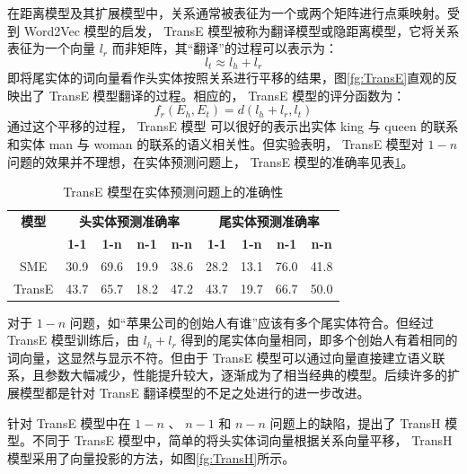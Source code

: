 \documentclass{llncs}
\begin{document}
在距离模型及其扩展模型中，关系通常被表征为一个或两个矩阵进行点乘映射。受到 Word2Vec 模型\cite{DBLP:conf/nips/MikolovSCCD13,DBLP:journals/corr/abs-1301-3781}的启发， TransE 模型\cite{DBLP:conf/nips/BordesUGWY13}被称为翻译模型或隐距离模型，它将关系表征为一个向量 $l_r$ 而非矩阵，其“翻译”的过程可以表示为：
\begin{displaymath}
l_t\approx l_h+l_r
\end{displaymath}
即将尾实体的词向量看作头实体按照关系进行平移的结果，图\ref{fg:TransE}直观的反映出了 TransE 模型翻译的过程。相应的， TransE 模型的评分函数为：
\begin{displaymath}
f_r(E_h,E_t)=d(l_h+l_r,l_t)
\end{displaymath}
通过这个平移的过程， TransE 模型 可以很好的表示出实体 king 与 queen 的联系和实体 man 与 woman 的联系的语义相关性。但实验\cite{DBLP:conf/nips/BordesUGWY13}表明， TransE 模型对 $1-n$ 问题的效果并不理想，在实体预测问题上， TransE 模型的准确率见表\ref{tb:TransE}。

\begin{table}
	\centering
	\caption{ TransE 模型在实体预测问题上的准确性}
	\label{tb:TransE}
	\begin{threeparttable}
		\begin{tabular}{ccccccccc}
			\hline
			\textbf{模型} & \multicolumn{4}{c}{\textbf{头实体预测准确率}} & \multicolumn{4}{c}{\textbf{尾实体预测准确率}} \\
			\textbf{} & \textbf{1-1} & \textbf{1-n} & \textbf{n-1} & \textbf{n-n} & \textbf{1-1} & \textbf{1-n} & \textbf{n-1} & \textbf{n-n} \\ \hline
			SME & 30.9 & 69.6 & 19.9 & 38.6 & 28.2 & 13.1 & 76.0 & 41.8\\
			TransE & 43.7 & 65.7 & 18.2 & 47.2 & 43.7 & 19.7 & 66.7 & 50.0 \\ \hline
		\end{tabular}
	\end{threeparttable}
\end{table}

对于 $1-n$ 问题，如“苹果公司的创始人有谁”应该有多个尾实体符合。但经过 TransE 模型训练后，由 $l_h+l_r$ 得到的尾实体向量相同，即多个创始人有着相同的词向量，这显然与显示不符。但由于 TransE 模型可以通过向量直接建立语义联系，且参数大幅减少，性能提升较大，逐渐成为了相当经典的模型。后续许多的扩展模型都是针对 TransE 翻译模型的不足之处进行的进一步改进。

针对 TransE 模型中在 $1-n$ 、 $n-1$ 和 $n-n$ 问题上的缺陷，提出了 TransH 模型\cite{DBLP:conf/aaai/WangZFC14}。不同于 TransE 模型中，简单的将头实体词向量根据关系向量平移， TransH 模型采用了向量投影的方法，如图\ref{fg:TransH}所示。
\end{document}
